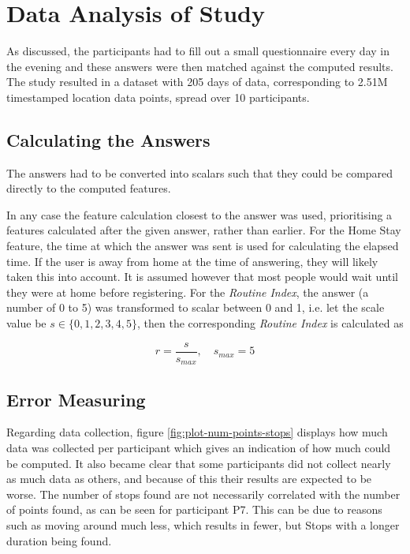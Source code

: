 \section{Data Analysis of Study}
As discussed, the participants had to fill out a small questionnaire every day in the evening and these answers were then matched against the computed results. The study resulted in a dataset with 205 days of data, corresponding to 2.51M timestamped location data points, spread over 10 participants.

\subsection{Calculating the Answers}
The answers had to be converted into scalars such that they could be compared directly to the computed features. 

In any case the feature calculation closest to the answer was used, prioritising a features calculated after the given answer, rather than earlier. For the Home Stay feature, the time at which the answer was sent is used for calculating the elapsed time. If the user is away from home at the time of answering, they will likely taken this into account. It is assumed however that most people would wait until they were at home before registering. For the \textit{Routine Index}, the answer (a number of 0 to 5) was transformed to scalar between 0 and 1, i.e. let the scale value be $s \in \{0, 1, 2, 3, 4, 5\}$, then the corresponding \textit{Routine Index} is calculated as 

\begin{equation}
    r = \frac{s}{s_{max}}, \quad s_{max} = 5
\end{equation}

\subsection{Error Measuring}
Regarding data collection, figure \ref{fig:plot-num-points-stops} displays how much data was collected per participant which gives an indication of how much could be computed. It also became clear that some participants did not collect nearly as much data as others, and because of this their results are expected to be worse. The number of stops found are not necessarily correlated with the number of points found, as can be seen for participant P7. This can be due to reasons such as moving around much less, which results in fewer, but Stops with a longer duration being found. 

